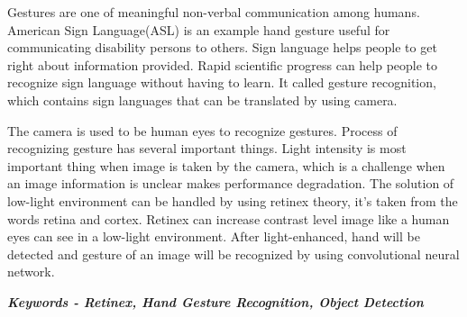 \documentclass{tesisilkomugm}
\begin{document}
\begin{abstracteng}
Gestures are one of meaningful non-verbal communication among humans. American Sign Language(ASL) is an example hand gesture useful for communicating disability persons to others. Sign language helps people to get right about information provided. Rapid scientific progress can help people to recognize sign language without having to learn. It called gesture recognition, which contains sign languages that can be translated by using camera.

The camera is used to be human eyes to recognize gestures. Process of recognizing gesture has several important things. Light intensity is most important thing when image is taken by the camera,  which is a challenge when an image information is unclear makes performance degradation. The solution of low-light environment can be handled by using retinex theory, it's taken from the words retina and cortex. Retinex can increase contrast level image like a human eyes can see in a low-light environment. After light-enhanced, hand will be detected and gesture of an image will be recognized by using convolutional neural network.

\textbf{\emph{Keywords - Retinex, Hand Gesture Recognition, Object Detection} }
\end{abstracteng}






\end{document}
